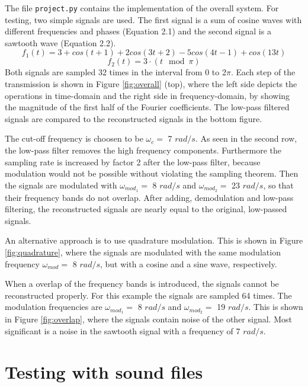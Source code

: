 \documentclass[12pt, a4paper]{report}
\begin{document}
The file \texttt{project.py} contains the implementation of the overall system.
For testing, two simple signals are used.
The first signal is a sum of cosine waves with different frequencies and phases (Equation 2.1)
and the second signal is a sawtooth wave (Equation 2.2).
\begin{equation}
	f_1(t) = 3 + cos(t+1) + 2cos(3t+2) - 5cos(4t-1) + cos(13t)
\end{equation}
\begin{equation}
	f_2(t) = 3 \cdot (t\mod\pi)
\end{equation}
Both signals are sampled 32 times in the interval from 0 to 2\(\pi\).
Each step of the transmission is shown in Figure \ref{fig:overall} (top), where the left side depicts the operations in time-domain
and the right side in frequency-domain, by showing the magnitude of the first half of the Fourier coefficients.
The low-pass filtered signals are compared to the reconstructed signals in the bottom figure.

The cut-off frequency is choosen to be \(\omega_c=\) 7 \(rad/s\).
As seen in the second row, the low-pass filter removes the high frequency components.
Furthermore the sampling rate is increased by factor 2 after the low-pass filter,
because modulation would not be possible without violating the sampling theorem.
Then the signals are modulated with \(\omega_{mod_1}=\) 8 \(rad/s\) and \(\omega_{mod_2}=\) 23 \(rad/s\),
so that their frequency bands do not overlap.
After adding, demodulation and low-pass filtering, the reconstructed signals are nearly equal to the original, low-passed signals.

An alternative approach is to use quadrature modulation.
This is shown in Figure \ref{fig:quadrature},
where the signals are modulated with the same modulation frequency \(\omega_{mod}=\) 8 \(rad/s\),
but with a cosine and a sine wave, respectively.

When a overlap of the frequency bands is introduced,
the signals cannot be reconstructed properly.
For this example the signals are sampled 64 times.
The modulation frequencies are \(\omega_{mod_1}=\) 8 \(rad/s\) and \(\omega_{mod_2}=\) 19 \(rad/s\).
This is shown in Figure \ref{fig:overlap},
where the signals contain noise of the other signal.
Most significant is a noise in the sawtooth signal with a frequency of 7 \(rad/s\).

\section{Testing with sound files}
\end{document}
